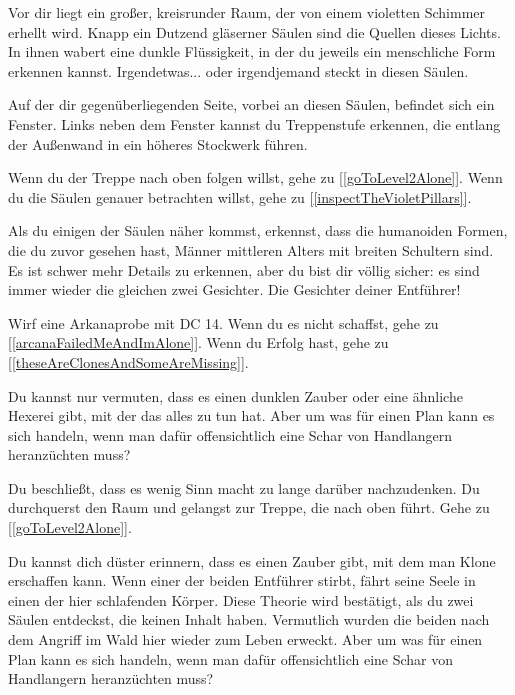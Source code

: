 
Vor dir liegt ein großer, kreisrunder Raum, der von einem violetten Schimmer erhellt wird. Knapp ein Dutzend gläserner Säulen sind die Quellen dieses Lichts. In ihnen wabert eine dunkle Flüssigkeit, in der du jeweils ein menschliche Form erkennen kannst. Irgendetwas... oder irgendjemand steckt in diesen Säulen.

Auf der dir gegenüberliegenden Seite, vorbei an diesen Säulen, befindet sich ein Fenster. Links neben dem Fenster kannst du Treppenstufe erkennen, die entlang der Außenwand in ein höheres Stockwerk führen.

Wenn du der Treppe nach oben folgen willst, gehe zu [\ref{goToLevel2Alone}].
Wenn du die Säulen genauer betrachten willst, gehe zu [\ref{inspectTheVioletPillars}].


Als du einigen der Säulen näher kommst, erkennst, dass die humanoiden Formen, die du zuvor gesehen hast, Männer mittleren Alters mit breiten Schultern sind. Es ist schwer mehr Details zu erkennen, aber du bist dir völlig sicher: es sind immer wieder die gleichen zwei Gesichter. Die Gesichter deiner Entführer!

Wirf eine Arkanaprobe mit DC 14. Wenn du es nicht schaffst, gehe zu [\ref{arcanaFailedMeAndImAlone}]. Wenn du Erfolg hast, gehe zu [\ref{theseAreClonesAndSomeAreMissing}].


Du kannst nur vermuten, dass es einen dunklen Zauber oder eine ähnliche Hexerei gibt, mit der das alles zu tun hat. Aber um was für einen Plan kann es sich handeln, wenn man dafür offensichtlich eine Schar von Handlangern heranzüchten muss?

Du beschließt, dass es wenig Sinn macht zu lange darüber nachzudenken. Du durchquerst den Raum und gelangst zur Treppe, die nach oben führt.
Gehe zu [\ref{goToLevel2Alone}].


Du kannst dich düster erinnern, dass es einen Zauber gibt, mit dem man Klone erschaffen kann. Wenn einer der beiden Entführer stirbt, fährt seine Seele in einen der hier schlafenden Körper. Diese Theorie wird bestätigt, als du zwei Säulen entdeckst, die keinen Inhalt haben. Vermutlich wurden die beiden nach dem Angriff im Wald hier wieder zum Leben erweckt. Aber um was für einen Plan kann es sich handeln, wenn man dafür offensichtlich eine Schar von Handlangern heranzüchten muss?


